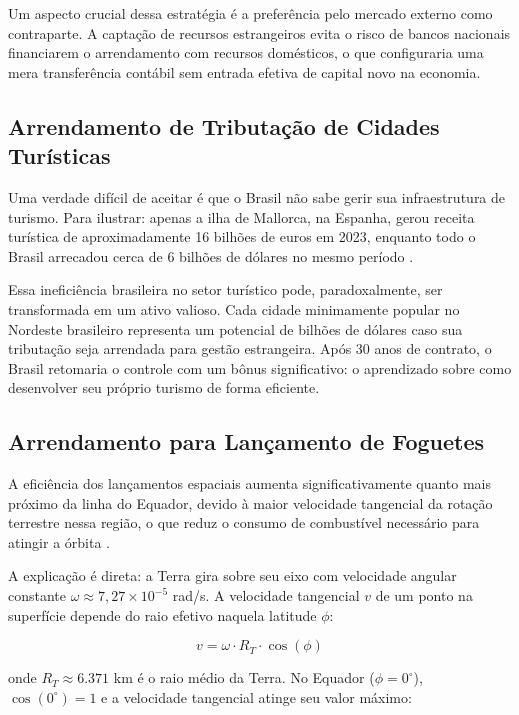 Um aspecto crucial dessa estratégia é a preferência pelo mercado externo como contraparte. A captação de recursos estrangeiros evita o risco de bancos nacionais financiarem o arrendamento com recursos domésticos, o que configuraria uma mera transferência contábil sem entrada efetiva de capital novo na economia.

\subsection{Arrendamento de Tributação de Cidades Turísticas}

Uma verdade difícil de aceitar é que o Brasil não sabe gerir sua infraestrutura de turismo. Para ilustrar: apenas a ilha de Mallorca, na Espanha, gerou receita turística de aproximadamente 16 bilhões de euros em 2023, enquanto todo o Brasil arrecadou cerca de 6 bilhões de dólares no mesmo período \cite{mallorca2023, embratur2023, unwto2023}.

Essa ineficiência brasileira no setor turístico pode, paradoxalmente, ser transformada em um ativo valioso. Cada cidade minimamente popular no Nordeste brasileiro representa um potencial de bilhões de dólares caso sua tributação seja arrendada para gestão estrangeira. Após 30 anos de contrato, o Brasil retomaria o controle com um bônus significativo: o aprendizado sobre como desenvolver seu próprio turismo de forma eficiente.

\subsection{Arrendamento para Lançamento de Foguetes}

A eficiência dos lançamentos espaciais aumenta significativamente quanto mais próximo da linha do Equador, devido à maior velocidade tangencial da rotação terrestre nessa região, o que reduz o consumo de combustível necessário para atingir a órbita \cite{wertz2011}.

A explicação é direta: a Terra gira sobre seu eixo com velocidade angular constante $\omega \approx 7{,}27 \times 10^{-5}$ rad/s. A velocidade tangencial $v$ de um ponto na superfície depende do raio efetivo naquela latitude $\phi$:

\begin{equation}
\label{eq:vel-tangencial}
v = \omega \cdot R_T \cdot \cos(\phi)
\end{equation}

\noindent onde $R_T \approx 6.371$ km é o raio médio da Terra. No Equador ($\phi = 0^{\circ}$), $\cos(0^{\circ}) = 1$ e a velocidade tangencial atinge seu valor máximo:

